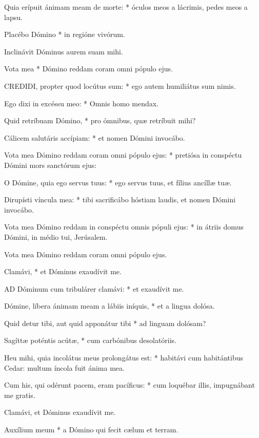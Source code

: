 Quia erípuit ánimam meam de morte: * óculos meos a lácrimis, pedes meos a lapsu.

Placébo Dómino * in regióne vivórum.

 Inclinávit Dóminus aurem suam mihi.

 Vota mea * Dómino reddam coram omni pópulo ejus.


\lettrine[lines=2]{C}{REDIDI}, propter quod locútus sum: * ego autem humiliátus sum nimis.

Ego dixi in excéssu meo: * Omnis homo mendax.

Quid retríbuam Dómino, * pro ómnibus, quæ retríbuit mihi?

Cálicem salutáris accípiam: * et nomen Dómini invocábo.

Vota mea Dómino reddam coram omni pópulo ejus: * pretiósa in conspéctu Dómini mors sanctórum ejus:

O Dómine, quia ego servus tuus: * ego servus tuus, et fílius ancíllæ tuæ.

Dirupísti víncula mea: * tibi sacrificábo hóstiam laudis, et nomen Dómini invocábo.

Vota mea Dómino reddam in conspéctu omnis pópuli ejus: * in átriis domus Dómini, in médio tui, Jerúsalem.

 Vota mea Dómino reddam coram omni pópulo ejus.

 Clamávi, * et Dóminus exaudívit me.


\lettrine[lines=2]{A}{D} Dóminum cum tribulárer clamávi: * et exaudívit me.

Dómine, líbera ánimam meam a lábiis iníquis, * et a lingua dolósa.

Quid detur tibi, aut quid apponátur tibi * ad linguam dolósam?

Sagíttæ poténtis acútæ, * cum carbónibus desolatóriis.

Heu mihi, quia incolátus meus prolongátus est: * habitávi cum habitántibus Cedar: multum íncola fuit ánima mea.

Cum his, qui odérunt pacem, eram pacíficus: * cum loquébar illis, impugnábant me gratis.

 Clamávi, et Dóminus exaudívit me.

 Auxílium meum * a Dómino qui fecit cælum et terram.


